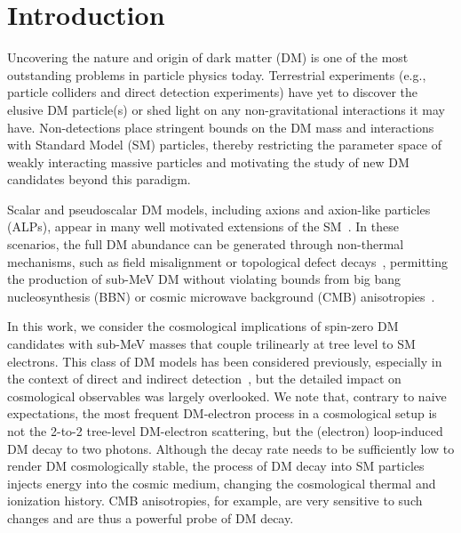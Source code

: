 \documentclass[aps,prd,twocolumn,showpacs,superscriptaddress,nofootinbib,preprintnumbers]{revtex4-2}
\begin{document}
\section{Introduction}
\label{sec:intro}

Uncovering the nature and origin of dark matter (DM) is one of the most outstanding problems in particle physics today.
Terrestrial experiments (e.g., particle colliders and direct detection experiments) have yet to discover the elusive DM particle(s) or shed light on any non-gravitational interactions it may have.
Non-detections place stringent bounds on the DM mass and interactions with Standard Model (SM) particles, thereby restricting the parameter space of weakly interacting massive particles and motivating the study of new DM candidates beyond this paradigm.

Scalar and pseudoscalar DM models, including axions and axion-like particles (ALPs), appear in many well motivated extensions of the SM~\cite{PhysRevLett.40.223, Adams:2022pbo,Choi:2020rgn,Raffelt:2006rj}.
In these scenarios, the full DM abundance can be generated through non-thermal mechanisms, such as field misalignment or topological defect decays~\cite{Batell:2022qvr, PRESKILL1983127, DINE1983137, DAVIS1986225, Gorghetto:2018myk, Gorghetto:2020qws, Lyth:1991ub, Co:2019jts, Co:2018mho, Co:2020dya, Cembranos:2019qlm}, permitting the production of sub-MeV DM without violating bounds from big bang nucleosynthesis (BBN) or cosmic microwave background (CMB) anisotropies~\cite{Boehm:2002yz,Serpico:2004nm,Nollett:2013pwa,Steigman:2014pfa,Nollett:2014lwa,Escudero:2018mvt,Sabti:2019mhn,Giovanetti:2021izc,An:2022sva,An:2024nsw}.

In this work, we consider the cosmological implications of spin-zero DM candidates with sub-MeV masses that couple trilinearly at tree level to SM electrons.
This class of DM models has been considered previously, especially in the context of direct and indirect detection~\cite{Mitridate:2021ctr, Knapen:2017xzo,Essig:2013goa}, but the detailed impact on cosmological observables was largely overlooked.
We note that, contrary to naive expectations, the most frequent DM-electron process in a cosmological setup is not the 2-to-2 tree-level DM-electron scattering, but the (electron) loop-induced DM decay to two photons.
Although the decay rate needs to be sufficiently low to render DM cosmologically stable, the process of DM decay into SM particles injects energy into the cosmic medium, changing the cosmological thermal and ionization history.
CMB anisotropies, for example, are very sensitive to such changes and are thus a powerful probe of DM decay.
\end{document}
